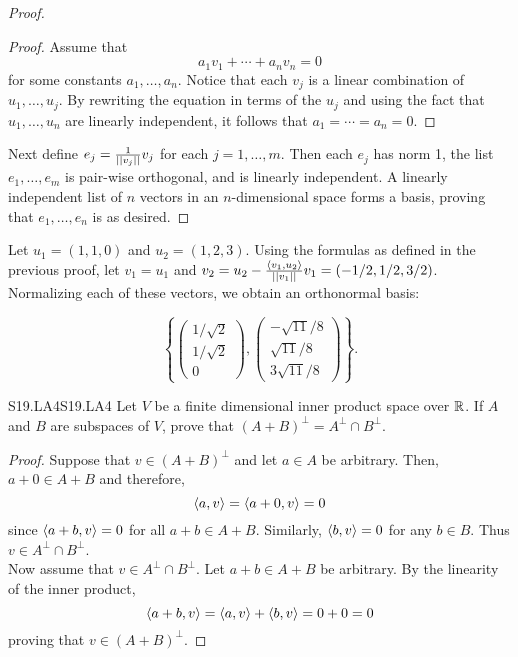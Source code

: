 \documentclass[../../AlgebraQualSolutions.tex]{subfiles}
\begin{document}
\begin{proof}
\begin{claim}
            \begin{proof}
                Assume that
                \[a_1v_1 + \cdots + a_nv_n = 0\]
                for some constants $a_1,\ldots, a_n$. Notice that each $v_j$ is a linear combination of $u_1,\ldots, u_j$. By rewriting the equation in terms of the $u_j$ and using the fact that $u_1,\ldots, u_n$ are linearly independent, it follows  that $a_1 = \cdots = a_n = 0$.
            \end{proof}
        \end{claim}

    Next define $e_j = \frac{1}{\norm[v_j]}v_j$ for each $j = 1,\ldots, m$. Then each $e_j$ has norm 1, the list $e_1,\ldots, e_m$ is pair-wise orthogonal, and is linearly independent. A linearly independent list of $n$ vectors in an $n$-dimensional space forms a basis, proving that $e_1,\ldots, e_n$ is as desired.
\end{proof}

\begin{solution}
    Let $u_1 = (1,1,0)$ and $u_2 = (1,2,3)$. Using the formulas as defined in the previous proof, let $v_1 = u_1$ and $v_2 = u_2 - \frac{\ip{v_1}{u_2}}{\norm[v_1]}v_1 = (-1/2,1/2,3/2)$. Normalizing each of these vectors, we obtain an orthonormal basis:

        \[\left\{ \begin{pmatrix} 1/\sqrt2\\ 1/\sqrt 2\\ 0 \end{pmatrix}, \begin{pmatrix}-\sqrt{11}/8 \\ \sqrt{11}/8\\ 3\sqrt{11}/8 \end{pmatrix} \right\}.\]
\end{solution}

\begin{prob}{S19.LA4}{S19.LA4}
    Let $V$ be a finite dimensional inner product space over $\R$. If $A$ and $B$ are subspaces of $V$, prove that $(A+B)^\perp = A^\perp \cap B^\perp$.
\end{prob}

\begin{proof}
    Suppose that $v \in (A+B)^\perp$ and let $a \in A$ be arbitrary. Then, $a + 0 \in A+B$ and therefore,
        \[\ip{a}{v} = \ip{a+0}{v} = 0\]
    since $\ip{a + b}{v} = 0$ for all $a + b \in A + B$. Similarly, $\ip{b}{v} = 0$ for any $b \in B$. Thus $v \in A^\perp \cap B^\perp$.\\

    Now assume that $v \in A^\perp \cap B^\perp$. Let $a + b \in A + B$ be arbitrary. By the linearity of the inner product,
        \[\ip{a + b}{v} = \ip{a}{v} + \ip{b}{v} = 0 + 0 = 0\]
    proving that $v \in (A+B)^\perp$.
\end{proof}
\end{document}
